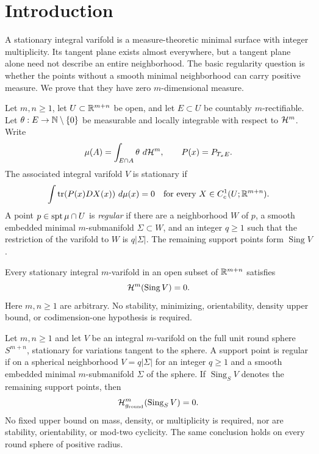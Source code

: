 \section{Introduction}\label{sec:introduction}

A stationary integral varifold is a measure-theoretic minimal surface with
integer multiplicity. Its tangent plane exists almost everywhere, but a tangent
plane alone need not describe an entire neighborhood. The basic regularity
question is whether the points without a smooth minimal neighborhood can carry
positive measure. We prove that they have zero $m$-dimensional measure.

Let $m,n\geq1$, let $U\subset\mathbb R^{m+n}$ be open, and let $E\subset U$ be
countably $m$-rectifiable. Let $\theta:E\to\mathbb N\setminus\{0\}$ be measurable and
locally integrable with respect to $\mathcal H^m$. Write
\[
 \mu(A)=\int_{E\cap A}\theta\,\mathop{}\!d\mathcal H^m,
 \qquad P(x)=P_{T_xE}.
\]
The associated integral varifold $V$ is stationary if
\begin{equation}\label{eq:stationarity}
 \int \operatorname{tr}(P(x)DX(x))\,\mathop{}\!d\mu(x)=0
 \quad\text{for every }X\in C_c^1(U;\mathbb R^{m+n}).
\end{equation}
A point $p\in\operatorname{spt}\mu\cap U$ is \emph{regular} if there are a neighborhood
$W$ of $p$, a smooth embedded minimal $m$-submanifold $\Sigma\subset W$, and
an integer $q\geq1$ such that the restriction of the varifold to $W$ is
$q|\Sigma|$. The remaining support points form $\operatorname{Sing}V$.

\begin{theorem}\label{thm:main}
Every stationary integral $m$-varifold in an open subset of $\mathbb R^{m+n}$ satisfies
\[
 \mathcal H^m(\operatorname{Sing}V)=0.
\]
Here $m,n\geq1$ are arbitrary. No stability, minimizing, orientability,
density upper bound, or codimension-one hypothesis is required.
\end{theorem}

\begin{corollary}\label{cor:round-spheres}
Let $m,n\geq1$ and let $V$ be an integral $m$-varifold on the full unit round
sphere $S^{m+n}$, stationary for variations tangent to the sphere. A support
point is regular if on a spherical neighborhood $V=q|\Sigma|$ for an integer
$q\geq1$ and a smooth embedded minimal $m$-submanifold $\Sigma$ of the sphere.
If $\operatorname{Sing}_S V$ denotes the remaining support points, then
\[
 \mathcal H^m_{g_{\mathrm{round}}}(\operatorname{Sing}_S V)=0.
\]
No fixed upper bound on mass, density, or multiplicity is required, nor are
stability, orientability, or mod-two cyclicity. The same conclusion holds on
every round sphere of positive radius.
\end{corollary}

